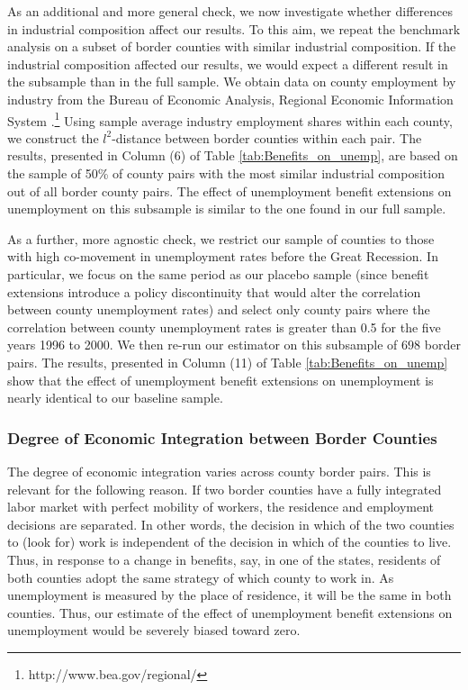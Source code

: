 \documentclass[12pt]{article}
\newcommand{\1}{\mathbf{1}}
\begin{document}
As an additional and more general check, we now investigate whether differences in industrial composition affect our results. To this aim, we repeat the benchmark analysis on a subset of border counties with similar industrial composition.  If the industrial composition affected our results, we would expect a different result in the subsample than in the full sample. We obtain data on county employment by industry from the Bureau of Economic Analysis, Regional Economic Information System \citep{data:bea-ca25n}.\footnote{http://www.bea.gov/regional/}  Using sample average industry employment shares within each county, we construct the $l^2$-distance between border counties within each pair. The results, presented in Column (6) of Table \ref{tab:Benefits_on_unemp}, are based on the sample of 50\% of county pairs with the most similar industrial composition out of all border county pairs. The effect of unemployment benefit extensions on unemployment on this subsample is similar to the one found in our full sample.

As a further, more agnostic check, we restrict our sample of counties to those with high co-movement in unemployment rates before the Great Recession. In particular, we focus on the same period as our placebo sample (since benefit extensions introduce a policy discontinuity that would alter the correlation between county unemployment rates) and select only county pairs where the correlation between county unemployment rates is greater than 0.5 for the five years 1996 to 2000. We then re-run our estimator on this subsample of $698$ border pairs. The results, presented in Column (11) of Table \ref{tab:Benefits_on_unemp} show that the effect of unemployment benefit extensions on unemployment is nearly identical to our baseline sample.


\subsubsection{Degree of Economic Integration between Border Counties}

The degree of economic integration varies across county border pairs. This is relevant for the following reason. If two border counties have a fully integrated labor market with perfect mobility of workers, the residence and employment decisions are separated. In other words, the decision in which of the two counties to (look for) work is independent of the decision in which of the counties to live. Thus, in response to a change in benefits, say, in one of the states, residents of both counties adopt the same strategy of which county to work in. As unemployment is measured by the place of residence, it will be the same in both counties. Thus, our estimate of the effect of unemployment benefit extensions on unemployment would be severely biased toward zero.
\end{document}
